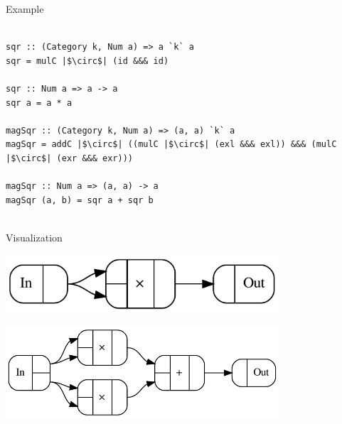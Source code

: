 \documentclass[12pt]{beamer}
\begin{document}
\begin{frame}[fragile]{Example}

\begin{adjustwidth}{-1.8em}{-1.8em}
\begin{verbatim}

sqr :: (Category k, Num a) => a `k` a
sqr = mulC |$\circ$| (id &&& id)

sqr :: Num a => a -> a
sqr a = a * a

magSqr :: (Category k, Num a) => (a, a) `k` a
magSqr = addC |$\circ$| ((mulC |$\circ$| (exl &&& exl)) &&& (mulC |$\circ$| (exr &&& exr)))

magSqr :: Num a => (a, a) -> a
magSqr (a, b) = sqr a + sqr b
  
\end{verbatim}
\end{adjustwidth}
\end{frame}

\begin{frame}[fragile]{Visualization}
  \begin{center}
    \includegraphics[width=4in]{figures/sqr}
  \end{center}
  \vspace{1cm}
  \begin{center}
    \includegraphics[width=4in]{figures/magSqr}
  \end{center}
\end{frame}
\end{document}
